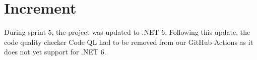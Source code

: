 \section{Increment}
During sprint 5, the project was updated to .NET 6. Following this update, the code quality checker Code QL had to be removed from our GitHub Actions as it does not yet support for .NET 6.